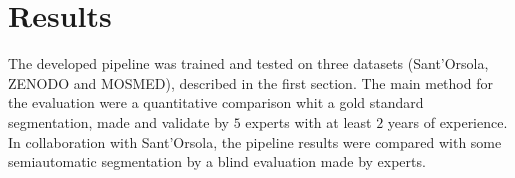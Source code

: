 \documentclass{standalone}
\begin{document}
	\chapter{Results}
	

	The developed pipeline was trained and tested on three datasets (Sant'Orsola, ZENODO and MOSMED), described in the first section. 
	The main method for the evaluation were a quantitative comparison whit a gold standard segmentation, made and validate by $5$ experts with at least $2$ years of experience. In collaboration with Sant'Orsola, the pipeline results were compared with some semiautomatic segmentation by a blind evaluation made by experts.
\end{document}
